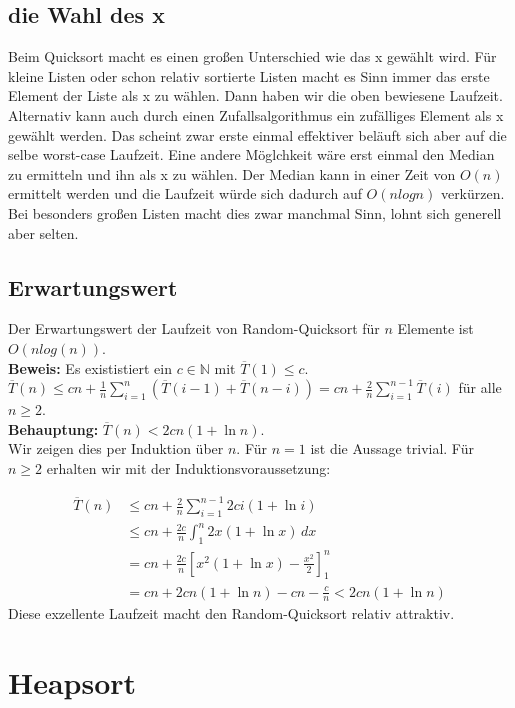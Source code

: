 \documentclass{article}
\begin{document}
 \subsection{die Wahl des x}
 Beim Quicksort macht es einen großen Unterschied wie das x gewählt wird. Für kleine Listen oder schon relativ sortierte Listen macht es Sinn immer das erste Element der Liste als x zu wählen. %
 Dann haben wir die oben bewiesene Laufzeit. Alternativ kann auch durch einen Zufallsalgorithmus ein zufälliges Element als x gewählt werden. Das scheint zwar erste einmal effektiver beläuft sich aber auf die selbe worst-case Laufzeit.
 Eine andere Möglchkeit wäre erst einmal den Median zu ermitteln und ihn als x zu wählen. Der Median kann in einer Zeit von $O(n)$ ermittelt werden und die Laufzeit würde sich dadurch auf $O(n logn) $ verkürzen. Bei besonders großen Listen macht dies zwar manchmal Sinn, lohnt sich generell aber selten.  
\subsection{Erwartungswert} {Der Erwartungswert der Laufzeit von Random-Quicksort für $n$ Elemente ist $O(n log(n))$}.
\\ \textbf{Beweis:}
Es exististiert ein $c\in \mathbb{N}$ mit $\overline{T}(1) \leq c$.
$\overline{T}(n)\leq cn + \frac{1}{n} \sum_{i=1}^{n} (\overline{T}(i-1) + \overline{T}(n-i)) = cn + \frac{2}{n} \sum_{i=1}^{n-1} \overline{T}(i)
 $ für alle $n\geq 2$.\\
 \textbf{Behauptung:} $\overline{T}(n) < 2cn(1 + \ln n)$. \\
Wir zeigen dies per Induktion über $n$. Für $n = 1$ ist die Aussage trivial. Für $n \geq 2$ erhalten wir mit der Induktionsvoraussetzung:

\begin{align*}
\overline{T}(n) &\leq cn + \frac{2}{n} \sum_{i=1}^{n-1} 2ci(1 + \ln i) \\
&\leq cn + \frac{2c}{n} \int_{1}^{n} 2x(1 + \ln x) \, dx \\
&= cn + \frac{2c}{n} \left[ x^2(1 + \ln x) - \frac{x^2}{2} \right]_{1}^{n} \\
&= cn + 2cn(1 + \ln n) - cn - \frac{c}{n} < 2cn(1 + \ln n)
\end{align*}
Diese exzellente Laufzeit macht den Random-Quicksort relativ attraktiv.

\section{Heapsort}
\end{document}
